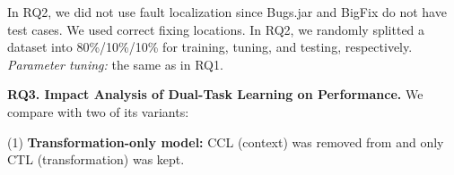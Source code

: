 



In RQ2, we did not use fault localization since Bugs.jar and
BigFix do not have test cases. We used correct fixing locations.  In
RQ2, we randomly splitted a dataset into
80\%/10\%/10\% for training, tuning, and testing,
respectively.
{\em Parameter tuning:} the same as in RQ1.






\vspace{2pt}
{\bf RQ3. Impact Analysis of Dual-Task Learning on Performance.}
We compare {\tool} with two of its variants:

(1) \textbf{Transformation-only model:}
CCL (context) was removed from {\tool} and only CTL (transformation)
was kept.

